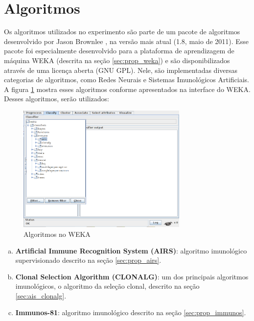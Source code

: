 \section{Algoritmos}

Os algoritmos utilizados no experimento são parte de um pacote de algoritmos desenvolvido por Jason Brownlee \cite{Brownlee2011}, na versão mais atual (1.8, maio de 2011). Esse pacote foi especialmente desenvolvido para a plataforma de aprendizagem de máquina WEKA (descrita na seção \ref{sec:prop_weka}) e são disponibilizados através de uma licença aberta (GNU GPL). Nele, são implementadas diversas categorias de algoritmos, como Redes Neurais e Sistemas Imunológicos Artificiais. A figura \ref{fig:prop_wekaais} mostra esses algoritmos conforme apresentados na interface do WEKA. Desses algoritmos, serão utilizados:

\vspace{0.5cm}
\begin{figure}[h]
    \centering
    \caption{Algoritmos no WEKA}
    \label{fig:prop_wekaais}
    \vspace{0.5cm}
    \includegraphics[width=0.75\textwidth]{img/weka_ais.png}
\end{figure}
\vspace{0.5cm}

\begin{enumerate}[a)]
    \item \textbf{Artificial Immune Recognition System (AIRS)}: algoritmo imunológico supervisionado descrito na seção \ref{sec:prop_airs}.
    \item \textbf{Clonal Selection Algorithm (CLONALG)}: um dos principais algoritmos imunológicos, o algoritmo da seleção clonal, descrito na seção \ref{sec:ais_clonalg}.
    \item \textbf{Immunos-81}: algoritmo imunológico descrito na seção \ref{sec:prop_immunos}.

\end{enumerate}

